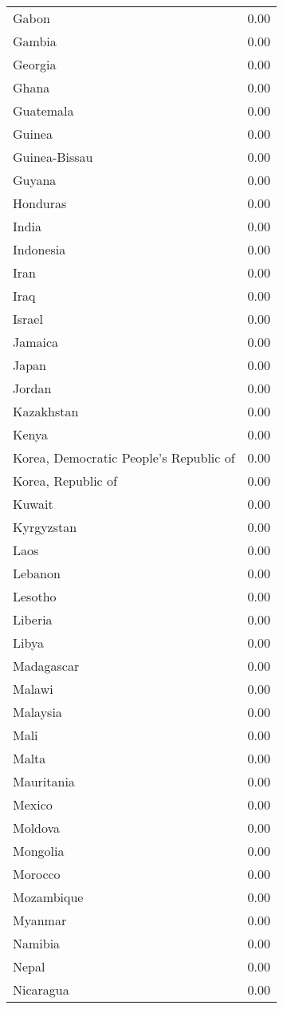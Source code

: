 \begin{table}[ht]
\begin{tabular}{lr}
  Gabon & 0.00 \\ 
  Gambia & 0.00 \\ 
  Georgia & 0.00 \\ 
  Ghana & 0.00 \\ 
  Guatemala & 0.00 \\ 
  Guinea & 0.00 \\ 
  Guinea-Bissau & 0.00 \\ 
  Guyana & 0.00 \\ 
  Honduras & 0.00 \\ 
  India & 0.00 \\ 
  Indonesia & 0.00 \\ 
  Iran & 0.00 \\ 
  Iraq & 0.00 \\ 
  Israel & 0.00 \\ 
  Jamaica & 0.00 \\ 
  Japan & 0.00 \\ 
  Jordan & 0.00 \\ 
  Kazakhstan & 0.00 \\ 
  Kenya & 0.00 \\ 
  Korea, Democratic People's Republic of & 0.00 \\ 
  Korea, Republic of & 0.00 \\ 
  Kuwait & 0.00 \\ 
  Kyrgyzstan & 0.00 \\ 
  Laos & 0.00 \\ 
  Lebanon & 0.00 \\ 
  Lesotho & 0.00 \\ 
  Liberia & 0.00 \\ 
  Libya & 0.00 \\ 
  Madagascar & 0.00 \\ 
  Malawi & 0.00 \\ 
  Malaysia & 0.00 \\ 
  Mali & 0.00 \\ 
  Malta & 0.00 \\ 
  Mauritania & 0.00 \\ 
  Mexico & 0.00 \\ 
  Moldova & 0.00 \\ 
  Mongolia & 0.00 \\ 
  Morocco & 0.00 \\ 
  Mozambique & 0.00 \\ 
  Myanmar & 0.00 \\ 
  Namibia & 0.00 \\ 
  Nepal & 0.00 \\ 
  Nicaragua & 0.00 \\ 

\end{tabular}
\end{table}
